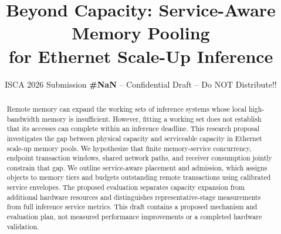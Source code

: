 \documentclass[conference]{IEEEtran}
\newcommand{\iscasubmissionnumber}{NaN}
\begin{document}
\setlength{\paperwidth}{8.5in}
\setlength{\paperheight}{11in}
\ifdefined\pdfpagewidth
  \pdfpagewidth=8.5in
  \pdfpageheight=11in
\else
\fi
{}
\title{Beyond Capacity: Service-Aware Memory Pooling\\
for Ethernet Scale-Up Inference}
\author{\normalsize{ISCA 2026 Submission
  \textbf{\#\iscasubmissionnumber} -- Confidential Draft -- Do NOT Distribute!!}}
\maketitle
\thispagestyle{plain}
\pagestyle{plain}

\begin{abstract}
Remote memory can expand the working sets of inference systems whose
local high-bandwidth memory is insufficient. However, fitting a working
set does not establish that its accesses can complete within an inference
deadline. This research proposal investigates the gap between physical
capacity and serviceable capacity in Ethernet scale-up memory pools.
We hypothesize that finite memory-service concurrency, endpoint transaction
windows, shared network paths, and receiver consumption jointly constrain
that gap. We outline service-aware placement and admission, which assigns
objects to memory tiers and budgets outstanding remote transactions using
calibrated service envelopes. The proposed evaluation separates capacity
expansion from additional hardware resources and distinguishes
representative-stage measurements from full inference service metrics.
This draft contains a proposed mechanism and evaluation plan, not measured
performance improvements or a completed hardware validation.
\end{abstract}







\end{document}
